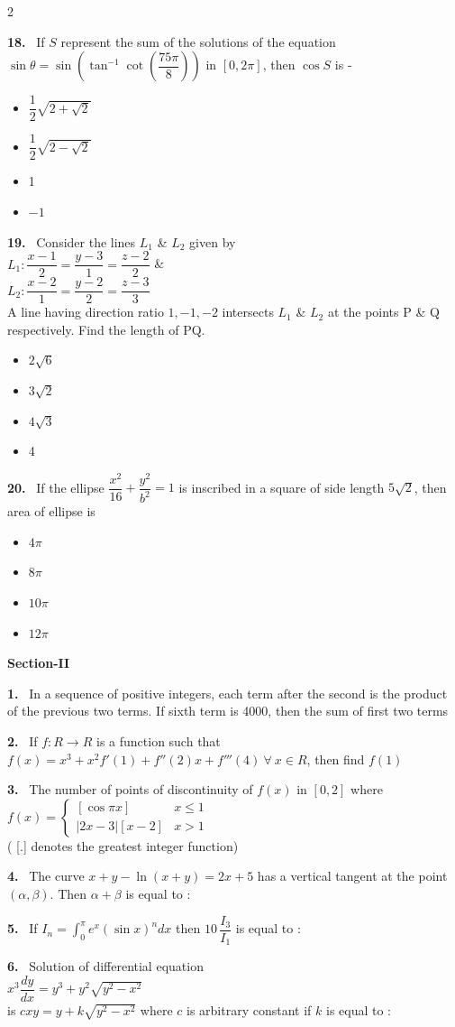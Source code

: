 \documentclass[10pt]{extarticle}
\newcommand{\sect}[1]{\par\smallskip\noindent\textbf{#1}\par}
\newcommand{\qn}[1]{\par\smallskip\noindent\textbf{#1.}~}
\newenvironment{qoptions}{\begin{itemize}[leftmargin=1.8em,itemsep=1pt,topsep=2pt,label={}]}{\end{itemize}}
\newcommand{\opt}[2]{\item[(#1)] #2}
\begin{document}
\begin{multicols}{2}
\qn{18} If $S$ represent the sum of the solutions of the equation $\sin\theta=\sin\left(\tan^{-1}\cot\left(\dfrac{75\pi}{8}\right)\right)$ in $[0,2\pi]$, then $\cos S$ is -
\begin{qoptions}
\opt{A}{$\dfrac12\sqrt{2+\sqrt2}$}
\opt{B}{$\dfrac12\sqrt{2-\sqrt2}$}
\opt{C}{1}
\opt{D}{$-1$}
\end{qoptions}

\qn{19} Consider the lines $L_1$ \& $L_2$ given by\\
$L_1:\dfrac{x-1}2=\dfrac{y-3}1=\dfrac{z-2}2$ \&\\
$L_2:\dfrac{x-2}1=\dfrac{y-2}2=\dfrac{z-3}3$\\
A line having direction ratio $1,-1,-2$ intersects $L_1$ \& $L_2$ at the points P \& Q respectively. Find the length of PQ.
\begin{qoptions}
\opt{A}{$2\sqrt6$}
\opt{B}{$3\sqrt2$}
\opt{C}{$4\sqrt3$}
\opt{D}{4}
\end{qoptions}

\qn{20} If the ellipse $\dfrac{x^2}{16}+\dfrac{y^2}{b^2}=1$ is inscribed in a square of side length $5\sqrt2$, then area of ellipse is
\begin{qoptions}
\opt{A}{$4\pi$}
\opt{B}{$8\pi$}
\opt{C}{$10\pi$}
\opt{D}{$12\pi$}
\end{qoptions}

\sect{Section-II}

\qn{1} In a sequence of positive integers, each term after the second is the product of the previous two terms. If sixth term is 4000, then the sum of first two terms

\qn{2} If $f:R\rightarrow R$ is a function such that $f(x)=x^3+x^2f'(1)+f''(2)x+f'''(4)\ \forall\ x\in R$, then find $f(1)$

\qn{3} The number of points of discontinuity of $f(x)$ in $[0,2]$ where\\
$f(x)=\begin{cases}[\cos\pi x]&x\leqslant1\\|2x-3|[x-2]&x>1\end{cases}$\\
( [.] denotes the greatest integer function)

\qn{4} The curve $x+y-\ln(x+y)=2x+5$ has a vertical tangent at the point $(\alpha,\beta)$. Then $\alpha+\beta$ is equal to :

\qn{5} If $I_n=\displaystyle\int_0^\pi e^x(\sin x)^ndx$ then $10\,\dfrac{I_3}{I_1}$ is equal to :

\qn{6} Solution of differential equation\\
$x^3\dfrac{dy}{dx}=y^3+y^2\sqrt{y^2-x^2}$\\
is $cxy=y+k\sqrt{y^2-x^2}$ where $c$ is arbitrary constant if $k$ is equal to :


\end{multicols}
\end{document}
